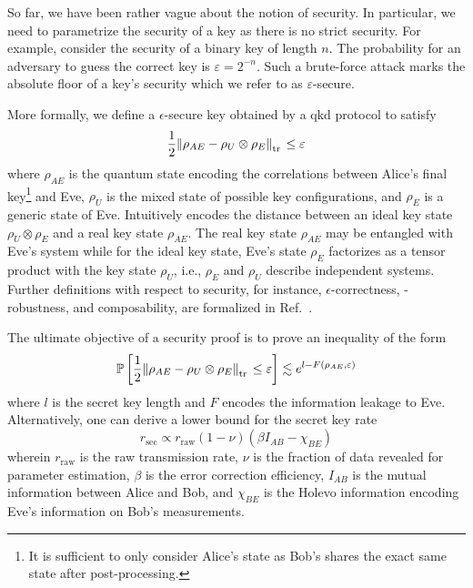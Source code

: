 So far, we have been rather vague about the notion of security.
In particular, we need to parametrize the security of a key as there is no strict security.
For example, consider the security of a binary key of length $n$.
The probability for an adversary to guess the correct key is $\varepsilon=2^{-n}$.
Such a brute-force attack marks the absolute floor of a key's security which we refer to as $\varepsilon$-secure.

More formally, we define a $\epsilon$-secure key obtained by a \gls{qkd} protocol to satisfy~\cite[p.~10]{Scarani2009}
\begin{equation}
	\frac{1}{2}
	\norm{\rho_{AE}-\rho_U\otimes\rho_E}_{\trace{}}
	\leq
	\varepsilon
	\label{eq:qkd_security}
\end{equation}
where $\rho_{AE}$ is the quantum state encoding the correlations between Alice's final key\footnote{It is sufficient to only consider Alice's state as Bob's shares the exact same state after post-processing.} and Eve, $\rho_U$ is the mixed state of possible key configurations, and $\rho_E$ is a generic state of Eve.
Intuitively  encodes the distance between an ideal key state $\rho_U\otimes\rho_E$ and a real key state $\rho_{AE}$.
The real key state $\rho_{AE}$ may be entangled with Eve's system while for the ideal key state, Eve's state $\rho_E$ factorizes as a tensor product with the key state $\rho_U$, i.e., $\rho_E$ and $\rho_U$ describe independent systems.
Further definitions with respect to security, for instance, $\epsilon$-correctness, -robustness, and composability, are formalized in Ref.~\cite[p.~119]{Wolf2021}.

The ultimate objective of a security proof is to prove an inequality of the form~\cite[p.~11]{Scarani2009}
\begin{equation}
	\mathbb{P}\left[
		\frac{1}{2}
		\norm{\rho_{AE}-\rho_U\otimes\rho_E}_{\trace{}}
		\leq
		\varepsilon
	\right]
	\lesssim
	e^{l-F(\rho_{AE},\varepsilon)}
\end{equation}
where $l$ is the secret key length and $F$ encodes the information leakage to Eve.
Alternatively, one can derive a lower bound for the secret key rate~\cite{Brunner2017}
\begin{equation}
	r_\text{sec}
	\propto
	r_\text{raw}
	(1-\nu)
	(\beta I_{AB}-\chi_{BE})
\end{equation}
wherein $r_\text{raw}$ is the raw transmission rate, $\nu$ is the fraction of data revealed for parameter estimation, $\beta$ is the error correction efficiency, $I_{AB}$ is the mutual information between Alice and Bob, and $\chi_{BE}$ is the Holevo information encoding Eve's information on Bob's measurements.

